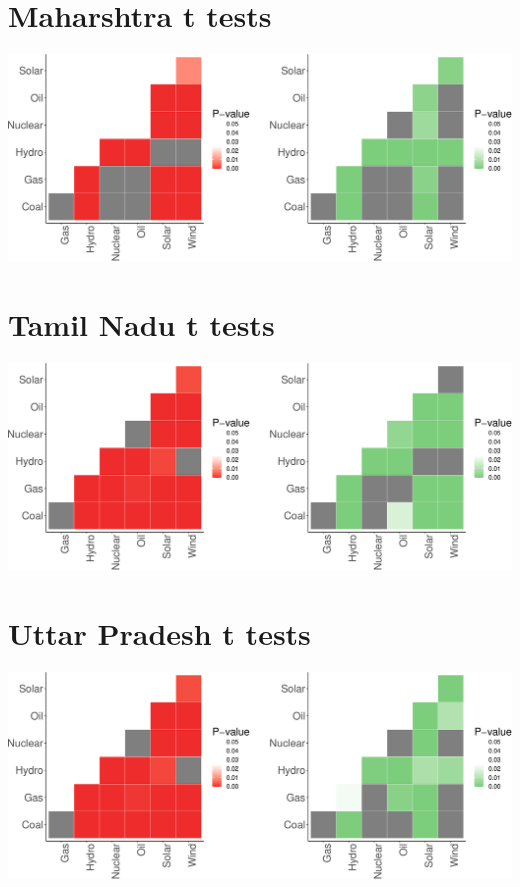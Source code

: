 \documentclass[
]{article}
\begin{document}
\hypertarget{maharshtra-t-tests}{%
\section{Maharshtra t tests}\label{maharshtra-t-tests}}

\includegraphics{nuclear-in-comparison_files/figure-latex/unnamed-chunk-19-1.pdf}

\hypertarget{tamil-nadu-t-tests}{%
\section{Tamil Nadu t tests}\label{tamil-nadu-t-tests}}

\includegraphics{nuclear-in-comparison_files/figure-latex/unnamed-chunk-20-1.pdf}

\hypertarget{uttar-pradesh-t-tests}{%
\section{Uttar Pradesh t tests}\label{uttar-pradesh-t-tests}}

\includegraphics{nuclear-in-comparison_files/figure-latex/unnamed-chunk-21-1.pdf}
\end{document}
